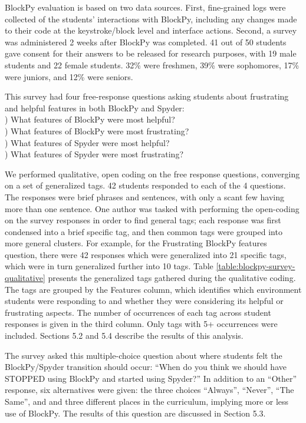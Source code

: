 \documentclass[10pt,journal,compsoc]{IEEEtran}
\begin{document}
BlockPy evaluation is based on two data sources.
First, fine-grained logs were collected of the students' interactions with BlockPy, including any changes made to their code at the keystroke/block level and interface actions.
Second, a survey was administered 2 weeks after BlockPy was completed.
41 out of 50 students gave consent for their answers to be released for research purposes, with 
19 male students and 22 female students.
32\% were freshmen, 39\% were sophomores, 17\% were juniors, and 12\% were seniors.

This survey had four free-response questions asking students about frustrating and helpful features in both BlockPy and Spyder:\\) What features of BlockPy were most helpful?\\) What features of BlockPy were most frustrating?\\) What features of Spyder were most helpful?\\) What features of Spyder were most frustrating?

We performed qualitative, open coding on the free response questions, converging on a set of generalized tags.
42 students responded to each of the 4 questions.
The responses were brief phrases and sentences, with only a scant few having more than one sentence.
One author was tasked with performing the open-coding on the survey responses in order to find general tags; each response was first condensed into a brief specific tag, and then common tags were grouped into more general clusters.
For example, for the Frustrating BlockPy features question, there were 42 responses which were generalized into 21 specific tags, which were in turn generalized further into 10 tags.
Table \ref{table:blockpy-survey-qualitative} presents the generalized tags gathered during the qualitative coding.
The tags are grouped by the Features column, which identifies which environment students were responding to and whether they were considering its helpful or frustrating aspects.
The number of occurrences of each tag across student responses is given in the third column.
Only tags with 5+ occurrences were included.
Sections 5.2 and 5.4 describe the results of this analysis.

The survey asked this multiple-choice question about where students felt the BlockPy/Spyder transition should occur:
``When do you think we should have STOPPED using BlockPy and started using Spyder?''
In addition to an ``Other'' response, six alternatives were given: the three choices ``Always'', ``Never'', ``The Same'', and and three different places in the curriculum, implying more or less use of BlockPy.
The results of this question are discussed in Section 5.3.
\end{document}

